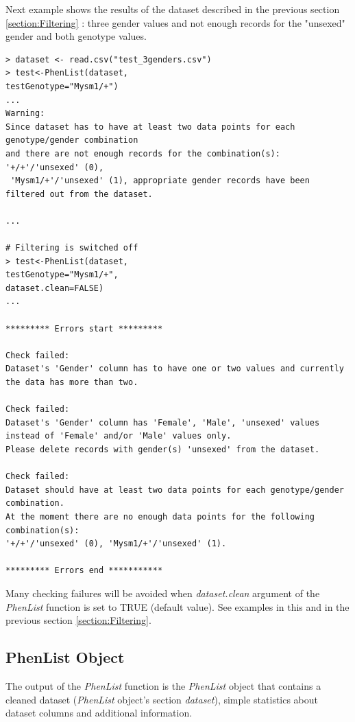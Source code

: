 \documentclass[12pt,a4paper]{article}
\begin{document}
Next example shows the results of the dataset described in the previous section \ref{section:Filtering} : three gender values and not enough records for the "unsexed" gender and both genotype values.

\begingroup
    \fontsize{8pt}{12pt}\selectfont
\begin{verbatim}
> dataset <- read.csv("test_3genders.csv")
> test<-PhenList(dataset,
testGenotype="Mysm1/+")
...
Warning:
Since dataset has to have at least two data points for each genotype/gender combination 
and there are not enough records for the combination(s): '+/+'/'unsexed' (0),
 'Mysm1/+'/'unsexed' (1), appropriate gender records have been filtered out from the dataset.

...

# Filtering is switched off
> test<-PhenList(dataset,
testGenotype="Mysm1/+",
dataset.clean=FALSE)
...

********* Errors start *********

Check failed:
Dataset's 'Gender' column has to have one or two values and currently the data has more than two.

Check failed:
Dataset's 'Gender' column has 'Female', 'Male', 'unsexed' values 
instead of 'Female' and/or 'Male' values only. 
Please delete records with gender(s) 'unsexed' from the dataset.

Check failed:
Dataset should have at least two data points for each genotype/gender combination. 
At the moment there are no enough data points for the following combination(s): 
'+/+'/'unsexed' (0), 'Mysm1/+'/'unsexed' (1).

********* Errors end ***********

\end{verbatim}
\endgroup

Many checking failures will be avoided when \textit{dataset.clean} argument of the \textit{PhenList} function is set to TRUE (default value). See examples in this and in the previous section \ref{section:Filtering}.

\subsection{PhenList Object}
The output of the \textit{PhenList} function is the \textit{PhenList} object that contains a cleaned dataset (\textit{PhenList} object's section \textit{dataset}), simple statistics about dataset columns and additional information. 
\end{document}
